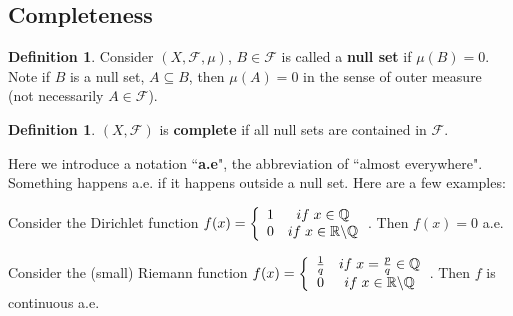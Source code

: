 \documentclass{article}
\theoremstyle{definition}
\newtheorem{definition}[theorem]{Definition}
\begin{document}
\subsection{Completeness}

\begin{definition}
Consider $(X,\mathscr{F}, \mu)$, $B \in \mathscr{F}$ is called a {\bf null set} if $\mu(B) = 0$. Note if $B$ is a null set, $A \subseteq B$, then $\mu(A) = 0$
in the sense of outer measure
(not necessarily $A \in \mathscr{F}$).
\end{definition}

\begin{definition} $(X,\mathscr{F})$ is {\bf complete} if all null sets are contained in $\mathscr{F}$.
\end{definition}

Here we introduce a notation ``{\bf a.e}", the abbreviation of ``almost everywhere". Something happens a.e. if it happens outside a null set. Here are a few examples:

\noindent
Consider the Dirichlet function $f(x) = \left\{ \begin{array}{cc}
    1 &  if \hspace{1mm} x \in \mathbb{Q} \\
    0 &  if \hspace{1mm} x \in \mathbb{R} \backslash \mathbb{Q}
\end{array}\right.$. Then $f(x) = 0$ a.e.

\noindent
Consider the (small) Riemann function $f(x) = \left\{ \begin{array}{cc}
    \frac{1}{q} & if \hspace{1mm} x = \frac{p}{q} \in \mathbb{Q}   \\
    0  & if \hspace{1mm} x \in \mathbb{R} \backslash \mathbb{Q}
\end{array}\right.$. Then $f$ is continuous a.e.
\end{document}
